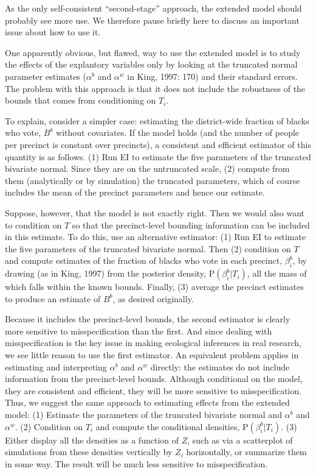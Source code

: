 \documentclass[11pt,titlepage]{article}
\renewcommand{\P}{\text{P}}
\begin{document}
As the only self-consistent ``second-stage'' approach, the extended
model should probably see more use.  We therefore pause briefly here
to discuss an important issue about how to use it.  

One apparently obvious, but flawed, way to use the extended model is
to study the effects of the explantory variables only by looking at
the truncated normal parameter estimates ($\alpha^b$ and $\alpha^w$ in
King, 1997: 170) and their standard errors.  The problem with this
approach is that it does not include the robustness of the bounds that
comes from conditioning on $T_i$.

To explain, consider a simpler case: estimating the district-wide
fraction of blacks who vote, $B^b$ without covariates.  If the model
holds (and the number of people per precinct is constant over
precincts), a consistent and efficient estimator of this quantity is
as follows.  (1) Run EI to estimate the five parameters of the
truncated bivariate normal.  Since they are on the untruncated scale,
(2) compute from them (analytically or by simulation) the truncated
parameters, which of course includes the mean of the precinct
parameters and hence our estimate.

Suppose, however, that the model is not exactly right.  Then we would
also want to condition on $T$ so that the precinct-level bounding
information can be included in this estimate.  To do this, use an
alternative estimator: (1) Run EI to estimate the five parameters of
the truncated bivariate normal.  Then (2) condition on $T$ and compute
estimates of the fraction of blacks who vote in each precinct,
$\beta_i^b$, by drawing (as in King, 1997) from the posterior density,
$\P(\beta_i^b|T_i)$, all the mass of which falls within the known
bounds.  Finally, (3) average the precinct estimates to produce an
estimate of $B^b$, as desired originally.

Because it includes the precinct-level bounds, the second estimator is
clearly more sensitive to misspecification than the first.  And since
dealing with misspecification is the key issue in making ecological
inferences in real research, we see little reason to use the first
estimator.  An equivalent problem applies in estimating and
interpreting $\alpha^b$ and $\alpha^w$ directly: the estimates do not
include information from the precinct-level bounds.  Although
conditional on the model, they are consistent and efficient, they will
be more sensitive to misspecification.  Thus, we suggest the same
approach to estimating effects from the extended model: (1) Estimate
the parameters of the truncated bivariate normal and $\alpha^b$ and
$\alpha^w$.  (2) Condition on $T_i$ and compute the conditional
densities, $\P(\beta_i^b|T_i)$.  (3) Either display all the densities
as a function of $Z$, such as via a scatterplot of simulations from
these densities vertically by $Z_i$ horizontally, or summarize them in
some way.  The result will be much less sensitive to misspecification.
\end{document}

